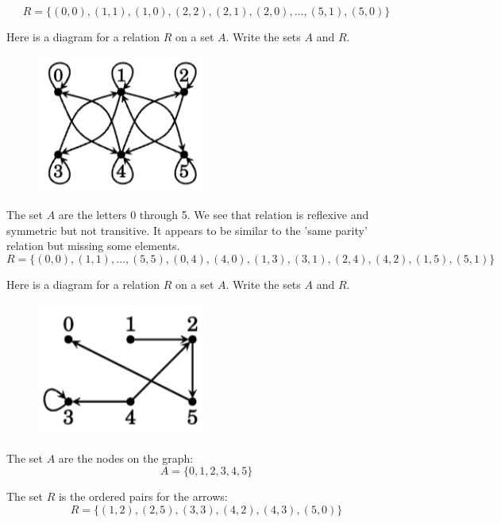 \documentclass{article}
\begin{document}
$$R = \{(0, 0), (1, 1), (1, 0), (2, 2), (2, 1), (2, 0), \ldots, (5, 1), (5, 0)\}$$

\begin{problem}
Here is a diagram for a relation $R$ on a set $A$. Write the sets $A$ and $R$.
\end{problem}
\begin{figure}[h]
  \centering
  \includegraphics[width=0.5\textwidth]{11.4.png}
  \label{fig:example}
\end{figure}

The set $A$ are the letters 0 through 5. We see that relation is reflexive and symmetric but not transitive. It appears to be similar to the 'same parity' relation but missing some elements.
$$R = \{(0, 0), (1, 1), \ldots, (5, 5), (0, 4), (4, 0), (1, 3), (3, 1), (2, 4), (4, 2), (1, 5), (5, 1)\}$$

\begin{problem}
Here is a diagram for a relation $R$ on a set $A$. Write the sets $A$ and $R$.
\end{problem}

\begin{figure}[h]
  \centering
  \includegraphics[width=0.5\textwidth]{11.5.png}
  \label{fig:example}
\end{figure}

The set $A$ are the nodes on the graph:
$$A = \{0, 1, 2, 3, 4, 5\}$$

The set $R$ is the ordered pairs for the arrows:
$$R = \{(1, 2), (2, 5), (3, 3), (4, 2), (4, 3), (5, 0)\}$$
\end{document}
